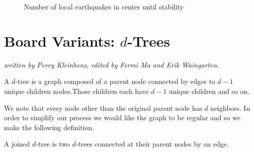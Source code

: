 \documentclass[runningheads,a4paper]{llncs}
\begin{document}
\begin{figure}[!ht]
\centering
{} \qquad
{}
\caption{Number of local earthquakes in center until stability}
\label{fig:growthofT'}
\end{figure}



\section{Board Variants: $d$-Trees}
\label{Board Variants: d-Trees}
\emph{written by Perry Kleinhenz, edited by Fermi Ma and Erik Waingarten.}\\


\begin{definition}
A $d$-tree is a graph composed of a parent node connected by edges to $d-1$ unique children nodes.Those children each have $d-1$ unique children and so on.  
\end{definition}
We note that every node other than the original parent node has $d$ neighbors. In order to simplify our process we would like the graph to be regular and so we make the following definition. 
\begin{definition}
A joined $d$-tree is two $d$-trees connected at their parent nodes by an edge.
\end{definition}
\end{document}

